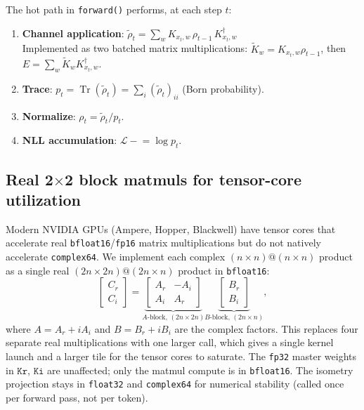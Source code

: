 \documentclass[11pt,a4paper]{article}
\newcommand{\Tr}{\operatorname{Tr}}
\newcommand{\Kx}[2]{K_{#1,#2}}     %
\theoremstyle{plain}
\begin{document}
The hot path in \texttt{forward()} performs, at each step $t$:
\begin{enumerate}
\item \textbf{Channel application}: $\tilde\rho_t = \sum_w \Kx{x_t}{w}\,\rho_{t-1}\,\Kx{x_t}{w}^\dagger$ \\
  Implemented as two batched matrix multiplications:
  $\tilde{K}_w = \Kx{x_t}{w}\rho_{t-1}$, then $E = \sum_w \tilde{K}_w \Kx{x_t}{w}^\dagger$.
\item \textbf{Trace}: $p_t = \Tr(\tilde\rho_t) = \sum_i (\tilde\rho_t)_{ii}$ \quad (Born probability).
\item \textbf{Normalize}: $\rho_t = \tilde\rho_t / p_t$.
\item \textbf{NLL accumulation}: $\mathcal{L} \mathrel{-}= \log p_t$.
\end{enumerate}

\subsection{Real 2$\times$2 block matmuls for tensor-core utilization}

Modern NVIDIA GPUs (Ampere, Hopper, Blackwell) have tensor cores that
accelerate real \texttt{bfloat16}/\texttt{fp16} matrix multiplications
but do not natively accelerate \texttt{complex64}. We implement each
complex $(n\times n)@(n\times n)$ product as a single real
$(2n\times 2n)@(2n\times n)$ product in \texttt{bfloat16}:
\begin{equation}\label{eq:block}
  \begin{bmatrix}
    C_r \\ C_i
  \end{bmatrix}
  =
  \underbrace{
  \begin{bmatrix}
    A_r & -A_i \\
    A_i &  A_r
  \end{bmatrix}
  }_{\text{$A$-block, }(2n\times 2n)}
  \underbrace{
  \begin{bmatrix}
    B_r \\ B_i
  \end{bmatrix}
  }_{\text{$B$-block, }(2n\times n)},
\end{equation}
where $A = A_r + iA_i$ and $B = B_r + iB_i$ are the complex factors.
This replaces four separate real multiplications with one larger call,
which gives a single kernel launch and a larger tile for the tensor
cores to saturate. The \texttt{fp32} master weights in $\mathtt{Kr}$,
$\mathtt{Ki}$ are unaffected; only the matmul compute is in
\texttt{bfloat16}. The isometry projection stays in \texttt{float32}
and \texttt{complex64} for numerical stability (called once per forward
pass, not per token).
\end{document}
